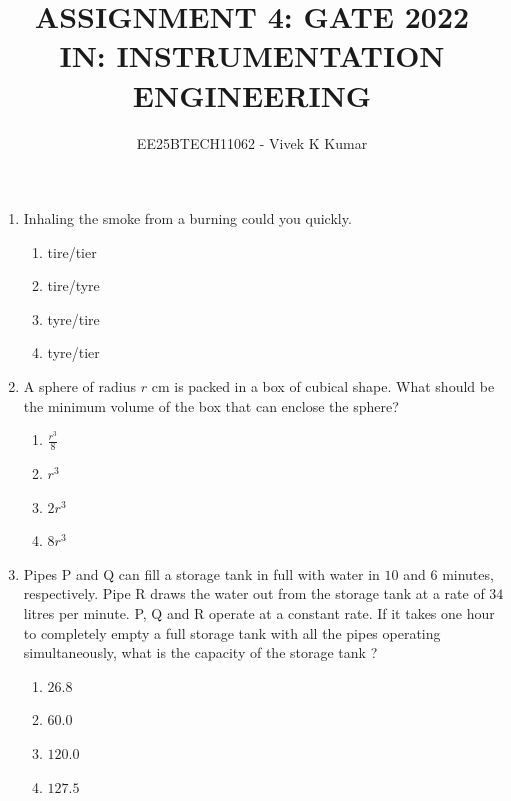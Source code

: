 \documentclass[journal,12pt,onecolumn]{IEEEtran}
\theoremstyle{remark}
\begin{document}
\title{
ASSIGNMENT 4: GATE 2022 \\
IN: INSTRUMENTATION ENGINEERING}
\author{EE25BTECH11062 - Vivek K Kumar}
\maketitle
\renewcommand{\thefigure}{\theenumi}
\renewcommand{\thetable}{\theenumi}

\begin{enumerate}
\item Inhaling the smoke from a burning \underline{\hspace{2cm}} could \underline{\hspace{2cm}} you quickly.

\hfill{}
\begin{enumerate}
\item tire/tier
\item tire/tyre
\item tyre/tire
\item tyre/tier
\end{enumerate}

\item A sphere of radius $r$ cm is packed in a box of cubical shape. What should be the minimum volume  of the box that can enclose the sphere?

\hfill{}
\begin{enumerate}
\item $\frac{r^3}{8}$
\item $r^3$
\item $2r^3$
\item $8r^3$
\end{enumerate}

\item Pipes P and Q can fill a storage tank in full with water in $10$ and $6$ minutes, respectively. Pipe R draws the water out from the storage tank at a rate of $34$ litres per minute. P, Q and R operate at a constant rate. If it takes one hour to completely empty a full storage tank with all the pipes operating simultaneously, what is the capacity of the storage tank ?

\hfill{}
\begin{enumerate}
\item $26.8$
\item $60.0$
\item $120.0$
\item $127.5$
\end{enumerate}


\end{enumerate}
\end{document}
